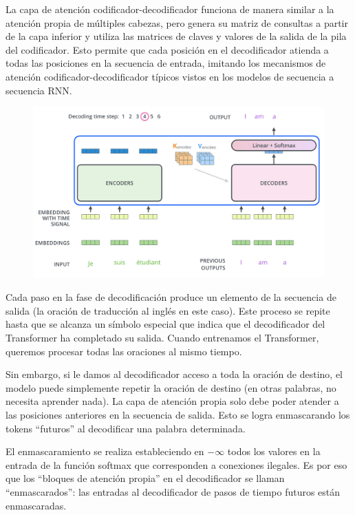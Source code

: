 La capa de atención codificador-decodificador funciona de manera similar a la atención propia de múltiples cabezas, pero genera su matriz de consultas a partir de la capa inferior y utiliza las matrices de claves y valores de la salida de la pila del codificador. Esto permite que cada posición en el decodificador atienda a todas las posiciones en la secuencia de entrada, imitando los mecanismos de atención codificador-decodificador típicos vistos en los modelos de secuencia a secuencia RNN.

\begin{figure}[h]
  \centering
  \includegraphics[scale=0.28]{pics/transformer_decoder.png}
\end{figure}

Cada paso en la fase de decodificación produce un elemento de la secuencia de salida (la oración de traducción al inglés en este caso). Este proceso se repite hasta que se alcanza un símbolo especial que indica que el decodificador del Transformer ha completado su salida. Cuando entrenamos el Transformer, queremos procesar todas las oraciones al mismo tiempo.

Sin embargo, si le damos al decodificador acceso a toda la oración de destino, el modelo puede simplemente repetir la oración de destino (en otras palabras, no necesita aprender nada). La capa de atención propia solo debe poder atender a las posiciones anteriores en la secuencia de salida. Esto se logra enmascarando los tokens ``futuros'' al decodificar una palabra determinada.

El enmascaramiento se realiza estableciendo en $- \infty$ todos los valores en la entrada de la función softmax que corresponden a conexiones ilegales. Es por eso que los ``bloques de atención propia'' en el decodificador se llaman ``enmascarados'': las entradas al decodificador de pasos de tiempo futuros están enmascaradas.



